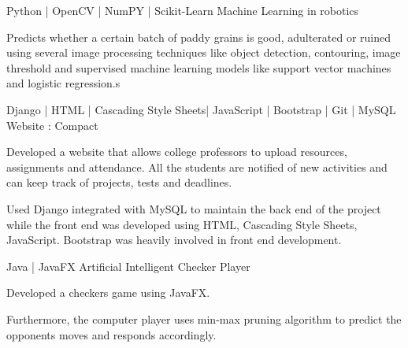 

\begin{cventries}

  \cventry
    {Python | OpenCV | NumPY | Scikit-Learn} %
    {Machine Learning in robotics} %
    {} %
    {} %
    {
      \begin{cvitems} %
        \item {Predicts whether a certain batch of paddy grains is good, adulterated or ruined using several image processing techniques like object detection, contouring, image threshold and supervised machine learning models like support vector machines and logistic regression.}s
      \end{cvitems}
    }

  \cventry
    {Django | HTML | Cascading Style Sheets| JavaScript | Bootstrap | Git | MySQL} %
    {Website : Compact} %
    {} %
    {} %
    {
      \begin{cvitems} %
        \item {Developed a website that allows college professors to upload resources, assignments and attendance. All the students are notified of new activities and can keep track of projects, tests and deadlines.}
        \item {Used Django integrated with MySQL to maintain the back end of the project while the front end was developed using HTML, Cascading Style Sheets, JavaScript. Bootstrap was heavily involved in front end development.}
      \end{cvitems}
    }

  \cventry
    {Java | JavaFX} %
    {Artificial Intelligent Checker Player} %
    {} %
    {} %
    {
      \begin{cvitems} %
        \item {Developed a checkers game using JavaFX.}
        \item {Furthermore, the computer player uses min-max pruning algorithm to predict the opponents moves and responds accordingly.}
      \end{cvitems}
    }


\end{cventries}
